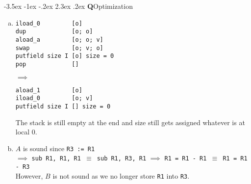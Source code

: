 \documentclass[12pt]{article}
\makeatletter
\renewcommand\section{\@startsection{section}{1}{\z@}%
  {-3.5ex \@plus -1ex \@minus -.2ex}%
                                       {2.3ex \@plus.2ex}%
                                       {\normalfont\bfseries Q}}
\makeatother
\begin{document}
\section{Optimization}
\begin{enumerate}[(a)]
\item
  \begin{minipage}{0.5\linewidth}
\begin{verbatim}
iload_0         [o]
dup             [o; o]
aload_a         [o; o; v]
swap            [o; v; o]
putfield size I [o] size = 0
pop             []
\end{verbatim}
  \end{minipage}
  $\implies$ \hspace{5 em}
  \begin{minipage}{0.5\linewidth}
\begin{verbatim}
aload_1         [o]
iload_0         [o; v]
putfield size I [] size = 0
\end{verbatim}
  \end{minipage}
  The stack is still empty at the end and size still gets assigned
  whatever is at local $0$.

\item $A$ is sound since \texttt{R3 := R1}
  \\$\implies$ \texttt{sub R1,
    R1, R1 $\equiv$ sub R1, R3, R1} $\implies$ \texttt{R1 = R1 - R1 $\equiv$ R1 = R1
    - R3}
  \\ However, $B$ is not sound as we no longer store \texttt{R1} into \texttt{R3}.
\end{enumerate}
\end{document}
